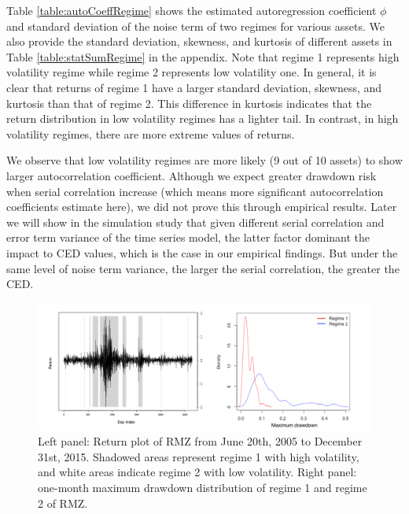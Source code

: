 \documentclass[11pt]{article}
\begin{document}
Table \ref{table:autoCoeffRegime} shows the estimated autoregression coefficient $\phi$ and standard deviation of the noise term of two regimes for various assets. We also provide the standard deviation, skewness, and kurtosis of different assets in Table \ref{table:statSumRegime} in the appendix. Note that regime 1 represents high volatility regime while regime 2 represents low volatility one. In general, it is clear that returns of regime 1 have a larger standard deviation, skewness, and kurtosis than that of regime 2. This difference in kurtosis indicates that the return distribution in low volatility regimes has a lighter tail. In contrast, in high volatility regimes, there are more extreme values of returns.

We observe that low volatility regimes are more likely (9 out of 10 assets) to show larger autocorrelation coefficient. Although we expect greater drawdown risk when serial correlation increase (which means more significant autocorrelation coefficients estimate here), we did not prove this through empirical results. Later we will show in the simulation study that given different serial correlation and error term variance of the time series model, the latter factor dominant the impact to CED values, which is the case in our empirical findings. But under the same level of noise term variance, the larger the serial correlation, the greater the CED.

\begin{figure}[H]
    \centering
    \includegraphics[width=1\textwidth]{../results/regime/RMZ_regime}
    \caption{Left panel: Return plot of RMZ from June 20th, 2005 to December 31st, 2015. Shadowed areas represent regime 1 with high volatility, and white areas indicate regime 2 with low volatility. Right panel: one-month maximum drawdown distribution of regime 1 and regime 2 of RMZ.}
    \label{fig: RMZregime}
\end{figure}
\end{document}
